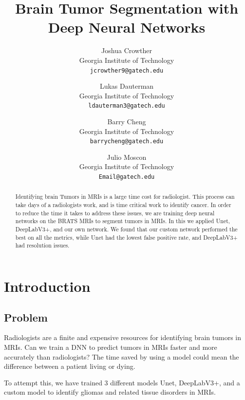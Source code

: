 \documentclass[10pt,twocolumn,letterpaper]{article}
\begin{document}
\title{Brain Tumor Segmentation with Deep Neural Networks}

\author{Joshua Crowther\\
Georgia Institute of Technology\\
{\tt\small jcrowther9@gatech.edu}
\and
Lukas Dauterman\\
Georgia Institute of Technology\\
{\tt\small ldauterman3@gatech.edu}
\and
Barry Cheng\\
Georgia Institute of Technology\\
{\tt\small barrycheng@gatech.edu}
\and
Julio Moscon\\
Georgia Institute of Technology\\
{\tt\small Email@gatech.edu}
}

\maketitle

\begin{abstract}
    Identifying brain Tumors in MRIs is a large time cost for radiologist. This process can take days of a radiologists work, and is time critical work to identify cancer. In order to reduce the time it takes to address these issues, we are training deep neural networks on the BRATS MRIs to segment tumors in MRIs. In this we applied Unet, DeepLabV3+, and our own network. We found that our custom network performed the best on all the metrics, while Unet had the lowest false positive rate, and DeepLabV3+ had resolution issues.
\end{abstract}

\section{Introduction}

\subsection{Problem}

Radiologists are a finite and expensive resources for identifying brain tumors in MRIs\cite{RAD}. Can we train a DNN to predict tumors in MRIs faster and more accurately than radiologists? The time saved by using a model could mean the difference between a patient living or dying.

To attempt this, we have trained 3 different models Unet, DeepLabV3+, and a custom model to identify gliomas and related tissue disorders in MRIs. 
\end{document}
